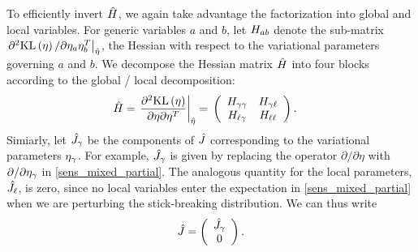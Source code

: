 To efficiently invert $\hat{H}$, we again take advantage the factorization into
global and local variables. For generic variables $a$ and $b$, let
$H_{ab}$ denote the sub-matrix $\left.\partial^2 \mathrm{KL}\left(\eta\right) / \partial
\eta_a \eta_b^T\right|_{\hat\eta}$, the Hessian with respect to the variational
parameters governing $a$ and $b$. We decompose the Hessian matrix $\hat{H}$
into four blocks according to the global / local decomposition:
%
\begin{align*}
%
\hessopt =
\fracat{\partial^2 \KL{\eta}}
       {\partial \eta \partial \eta^T}
       {\etaopt} ={}&
\left(
\begin{array}{cc}
   \hess{\gamma\gamma} & \hess{\gamma\ell} \\
   \hess{\ell\gamma}     & \hess{\ell\ell} \\
\end{array}
\right).
%
\end{align*}
%
Simiarly, let $\hat J_\gamma$ be the components of $\hat J$
corresponding to the variational parameters $\eta_{\gamma}$.  For example,
$\hat J_\gamma$ is given by replacing the operator $\partial / \partial
\eta$ with $\partial / \partial \eta_{\gamma}$ in \eqref{sens_mixed_partial}. The
analogous quantity for the local parameters, $\hat J_\ell$, is zero,
since no local variables enter the expectation in \eqref{sens_mixed_partial}
when we are perturbing the stick-breaking distribution.
%
We can thus write
\begin{align*}
  \hat J = \left( \begin{array}{c} \hat J_\gamma \\ 0 \end{array}\right).
\end{align*}

